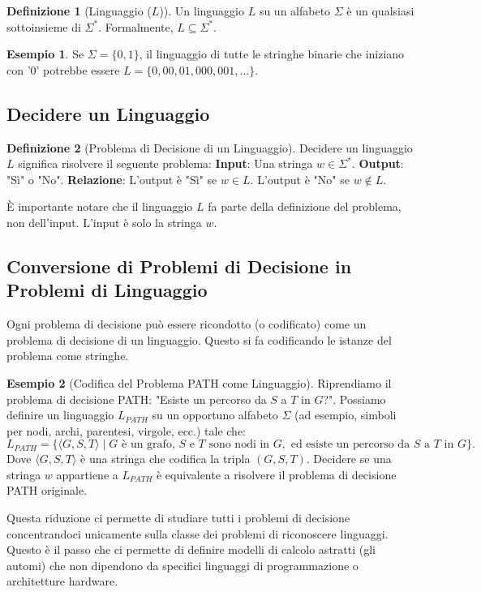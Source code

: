 \documentclass[a4paper]{article}
\theoremstyle{definition} %
\newtheorem{definition}{Definizione}
\newtheorem{example}{Esempio}
\begin{document}
\begin{definition}[Linguaggio ($L$)]
Un linguaggio $L$ su un alfabeto $\Sigma$ è un qualsiasi sottoinsieme di $\Sigma^*$.
Formalmente, $L \subseteq \Sigma^*$.
\end{definition}
\begin{example}
Se $\Sigma = \{0, 1\}$, il linguaggio di tutte le stringhe binarie che iniziano con '0' potrebbe essere $L = \{0, 00, 01, 000, 001, \ldots\}$.
\end{example}

\subsection{Decidere un Linguaggio}

\begin{definition}[Problema di Decisione di un Linguaggio]
Decidere un linguaggio $L$ significa risolvere il seguente problema:
\textbf{Input}: Una stringa $w \in \Sigma^*$.
\textbf{Output}: "Sì" o "No".
\textbf{Relazione}: L'output è "Sì" se $w \in L$. L'output è "No" se $w \notin L$.
\end{definition}
È importante notare che il linguaggio $L$ fa parte della definizione del problema, non dell'input. L'input è solo la stringa $w$.

\subsection{Conversione di Problemi di Decisione in Problemi di Linguaggio}
Ogni problema di decisione può essere ricondotto (o codificato) come un problema di decisione di un linguaggio. Questo si fa codificando le istanze del problema come stringhe.

\begin{example}[Codifica del Problema PATH come Linguaggio]
Riprendiamo il problema di decisione PATH: "Esiste un percorso da $S$ a $T$ in $G$?".
Possiamo definire un linguaggio $L_{PATH}$ su un opportuno alfabeto $\Sigma$ (ad esempio, simboli per nodi, archi, parentesi, virgole, ecc.) tale che:
\[L_{PATH} = \{ \langle G, S, T \rangle \mid G \text{ è un grafo, } S \text{ e } T \text{ sono nodi in } G, \text{ ed esiste un percorso da } S \text{ a } T \text{ in } G \}.\]
Dove $\langle G, S, T \rangle$ è una stringa che codifica la tripla $(G, S, T)$.
Decidere se una stringa $w$ appartiene a $L_{PATH}$ è equivalente a risolvere il problema di decisione PATH originale.
\end{example}
Questa riduzione ci permette di studiare tutti i problemi di decisione concentrandoci unicamente sulla classe dei problemi di riconoscere linguaggi. Questo è il passo che ci permette di definire modelli di calcolo astratti (gli automi) che non dipendono da specifici linguaggi di programmazione o architetture hardware.
\end{document}
